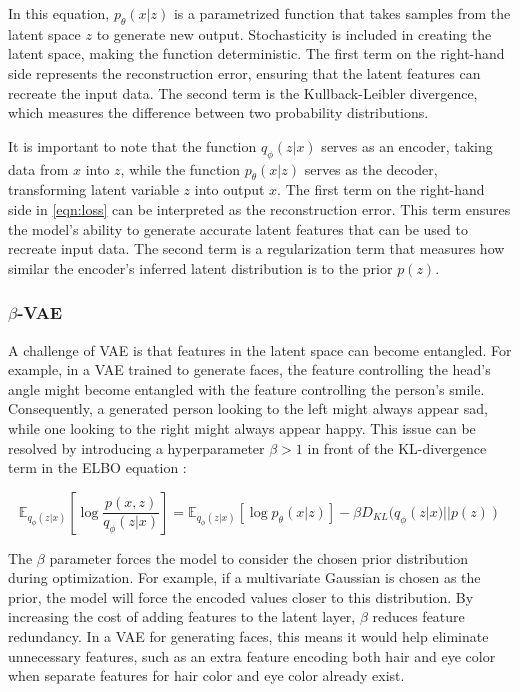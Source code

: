 In this equation, $p_\theta(x|z)$ is a parametrized function that takes samples from the latent space $z$ to generate new output. Stochasticity is included in creating the latent space, making the function deterministic. The first term on the right-hand side represents the reconstruction error, ensuring that the latent features can recreate the input data. The second term is the Kullback-Leibler divergence, which measures the difference between two probability distributions.

It is important to note that the function $q_\phi(z|x)$ serves as an encoder, taking data from $x$ into $z$, while the function $p_\theta(x|z)$ serves as the decoder, transforming latent variable $z$ into output $x$. The first term on the right-hand side in \autoref{eqn:loss} can be interpreted as the reconstruction error. This term ensures the model's ability to generate accurate latent features that can be used to recreate input data. The second term is a regularization term that measures how similar the encoder's inferred latent distribution is to the prior $p(z)$. 

\subsubsection{$\beta$-VAE}

A challenge of VAE is that features in the latent space can become entangled. For example, in a VAE trained to generate faces, the feature controlling the head's angle might become entangled with the feature controlling the person's smile. Consequently, a generated person looking to the left might always appear sad, while one looking to the right might always appear happy. This issue can be resolved by introducing a hyperparameter $\beta >1$ in front of the KL-divergence term in the ELBO equation \citep{higgins2017betavae}:

\begin{equation}\label{eqn:beta}
 \mathbb{E}_{q_\phi(z|x)}\left[\log \frac{p(x,z)}{q_\phi(z|x)}  \right]
 = \mathbb{E}_{q_\phi(z|x)}[\log p_\theta (x|z)] -\beta D_{KL}(q_\phi(z|x)||p(z))
\end{equation}

The $\beta$ parameter forces the model to consider the chosen prior distribution during optimization. For example, if a multivariate Gaussian is chosen as the prior, the model will force the encoded values closer to this distribution. By increasing the cost of adding features to the latent layer, $\beta$ reduces feature redundancy. In a VAE for generating faces, this means it would help eliminate unnecessary features, such as an extra feature encoding both hair and eye color when separate features for hair color and eye color already exist.


